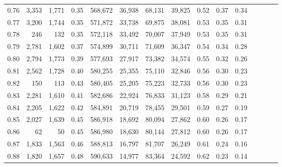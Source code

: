 \begin{tabular}{rrrcrrrrrrrrrrr}
0.76 &   3,353 &   1,771 &                                       0.35 &  568,672 &   36,938 &   68,131 &   39,825 &  0.52 &  0.37 &                         0.34 \\
0.77 &   3,200 &   1,744 &                                       0.35 &  571,872 &   33,738 &   69,875 &   38,081 &  0.53 &  0.35 &                         0.31 \\
0.78 &     246 &     132 &                                       0.35 &  572,118 &   33,492 &   70,007 &   37,949 &  0.53 &  0.35 &                         0.31 \\
0.79 &   2,781 &   1,602 &                                       0.37 &  574,899 &   30,711 &   71,609 &   36,347 &  0.54 &  0.34 &                         0.28 \\
0.80 &   2,794 &   1,773 &                                       0.39 &  577,693 &   27,917 &   73,382 &   34,574 &  0.55 &  0.32 &                         0.26 \\
0.81 &   2,562 &   1,728 &                                       0.40 &  580,255 &   25,355 &   75,110 &   32,846 &  0.56 &  0.30 &                         0.23 \\
0.82 &     150 &     113 &                                       0.43 &  580,405 &   25,205 &   75,223 &   32,733 &  0.56 &  0.30 &                         0.23 \\
0.83 &   2,281 &   1,610 &                                       0.41 &  582,686 &   22,924 &   76,833 &   31,123 &  0.58 &  0.29 &                         0.21 \\
0.84 &   2,205 &   1,622 &                                       0.42 &  584,891 &   20,719 &   78,455 &   29,501 &  0.59 &  0.27 &                         0.19 \\
0.85 &   2,027 &   1,639 &                                       0.45 &  586,918 &   18,692 &   80,094 &   27,862 &  0.60 &  0.26 &                         0.17 \\
0.86 &      62 &      50 &                                       0.45 &  586,980 &   18,630 &   80,144 &   27,812 &  0.60 &  0.26 &                         0.17 \\
0.87 &   1,833 &   1,563 &                                       0.46 &  588,813 &   16,797 &   81,707 &   26,249 &  0.61 &  0.24 &                         0.16 \\
0.88 &   1,820 &   1,657 &                                       0.48 &  590,633 &   14,977 &   83,364 &   24,592 &  0.62 &  0.23 &                         0.14 \\

\end{tabular}
